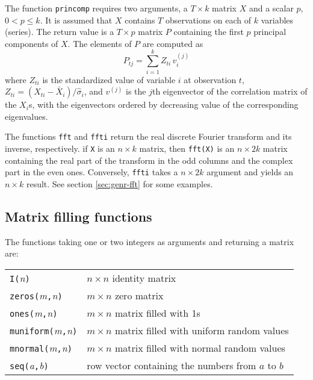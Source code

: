 The function \texttt{princomp} requires two arguments, a $T \times k$
matrix $X$ and a scalar $p$, $0 < p \leq k$.  It is assumed that $X$
contains $T$ observations on each of $k$ variables (series).  The
return value is a $T \times p$ matrix $P$ containing the first $p$
principal components of $X$.  The elements of $P$ are computed as
\[
P_{tj} = \sum_{i=1}^{k} Z_{ti} \, v^{(j)}_i
\]
where $Z_{ti}$ is the standardized value of variable $i$ at
observation $t$, $Z_{ti} = (X_{ti} - \bar{X}_i) / \hat{\sigma}_i$, and
$v^{(j)}$ is the $j$th eigenvector of the correlation matrix of the
$X_i$s, with the eigenvectors ordered by decreasing value of the
corresponding eigenvalues.

The functions \texttt{fft} and \texttt{ffti} return the real discrete
Fourier transform and its inverse, respectively. if \texttt{X} is an $n
\times k$ matrix, then \texttt{fft(X)} is an $n \times 2k$ matrix
containing the real part of the transform in the odd columns and the
complex part in the even ones. Conversely, \texttt{ffti} takes a $n
\times 2k$ argument and yields an $n \times k$ result. See section
\ref{sec:genr-fft} for some examples.

\subsection{Matrix filling functions}
\label{matrix-fill}

The functions taking one or two integers as arguments and returning
a matrix are:

\begin{center}
\begin{tabular}{ll}
\texttt{I(}\textsl{n}\texttt{)} & $n\times n$ identity matrix \\
\texttt{zeros(}\textsl{m}\texttt{,}\textsl{n}\texttt{)} & 
   $m\times n$ zero matrix \\
\texttt{ones(}\textsl{m}\texttt{,}\textsl{n}\texttt{)} &
   $m\times n$ matrix filled with 1s \\
\texttt{muniform(}\textsl{m}\texttt{,}\textsl{n}\texttt{)} &
   $m\times n$ matrix filled with uniform random values \\
\texttt{mnormal(}\textsl{m}\texttt{,}\textsl{n}\texttt{)} &
   $m\times n$ matrix filled with normal random values \\
\texttt{seq(}\textsl{a}\texttt{,}\textsl{b}\texttt{)} &
   row vector containing the numbers from $a$ to $b$
\end{tabular}
\end{center}

